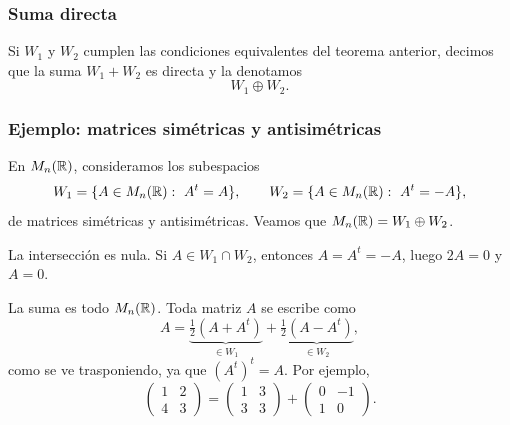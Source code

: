 \begin{frame}
    \frametitle{Suma directa}

    \begin{definition}
        Si $W_1$ y $W_2$ cumplen las condiciones equivalentes del teorema
        anterior, decimos que la suma $W_1+W_2$ es \alert{directa} y la
        denotamos
        \[
            W_1\oplus W_2.
        \]
    \end{definition}

\end{frame}


\begin{frame}
    \frametitle{Ejemplo: matrices simétricas y antisimétricas}

    \begin{example}
        En $M_n(\mathbb{R})$, consideramos los subespacios
        \[
            W_1=\{A\in M_n(\mathbb{R}):\ A^t=A\},
            \qquad
            W_2=\{A\in M_n(\mathbb{R}):\ A^t=-A\},
        \]
        de matrices \alert{simétricas} y \alert{antisimétricas}. Veamos que 
        $M_n(\mathbb{R})=W_1\oplus W_2$.
    \end{example}

    \alert{La intersección es nula.} Si $A\in W_1\cap W_2$, entonces
    $A=A^t=-A$, luego $2A=0$ y $A=0$.

    \alert{La suma es todo $M_n(\mathbb{R})$.} Toda matriz $A$ se escribe como
    \[
        A=\underbrace{\tfrac12(A+A^t)}_{\in W_1}
        +\underbrace{\tfrac12(A-A^t)}_{\in W_2},
    \]
    como se ve trasponiendo, ya que $(A^t)^t=A$. Por ejemplo,
    \[
        \begin{pmatrix}1&2\\4&3\end{pmatrix}
        =\begin{pmatrix}1&3\\3&3\end{pmatrix}
        +\begin{pmatrix}0&-1\\1&0\end{pmatrix}.
    \]
\end{frame}


